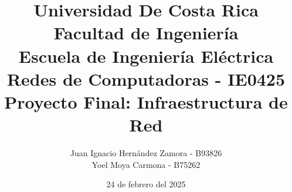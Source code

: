 


\title{ {\Huge Universidad De Costa Rica} \\
        {\LARGE Facultad de Ingeniería} \\
        {\LARGE Escuela de Ingeniería Eléctrica} \\ \vspace{3.5cm}
        {\LARGE Redes de Computadoras - IE0425} \\
        {\LARGE Proyecto Final: Infraestructura de Red}\\ \vspace{2.5cm}
}

\author{ {\Large Juan Ignacio Hernández Zamora - B93826} \\ 
         {\Large Yoel Moya Carmona - B75262} \\ \vspace{3cm}
}

\date{24 de febrero del 2025}





\begin{titlingpage}
    \maketitle
\end{titlingpage}


\tableofcontents
\clearpage{\pagestyle{empty}}








\printbibliography[title={Referencias}]


